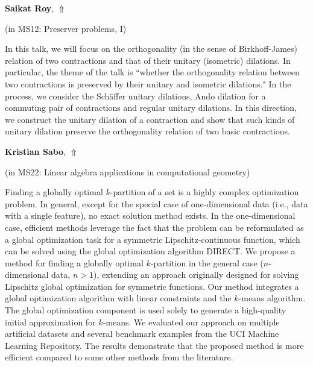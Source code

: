 \documentclass[ILAS2025-program.tex]{subfiles}
\begin{document}
     \hypertarget{down0162}{}\begin{ilasabstract}
    
    \textbf{Saikat Roy},  \hfill \hyperlink{up0162}{$\Uparrow$}
    
    (in {\color{mstitle}MS12: Preserver problems, I})
        
        \mtskip
    In this talk, we will focus on the orthogonality (in the sense of Birkhoff-James) relation of two contractions and that of their unitary (isometric) dilations. In particular, the theme of the talk is ``whether the orthogonality relation between two contractions is preserved by their unitary and isometric dilations." In the process, we consider the Sch\"{a}ffer unitary dilations, Ando dilation for a commuting pair of contractions and regular unitary dilations. In this direction, we construct the unitary dilation of a contraction and show that such kinds of unitary dilation preserve the orthogonality relation of two basic contractions.\end{ilasabstract}
     \hypertarget{down0069}{}\begin{ilasabstract}
    
    \textbf{Kristian Sabo},  \hfill \hyperlink{up0069}{$\Uparrow$}
    
    (in {\color{mstitle}MS22: Linear algebra applications in computational geometry})
        
        \mtskip
    Finding a globally optimal \( k \)-partition of a set is a highly complex optimization problem. In general, except for the special case of one-dimensional data (i.e., data with a single feature), no exact solution method exists. In the one-dimensional case, efficient methods leverage the fact that the problem can be reformulated as a global optimization task for a symmetric Lipschitz-continuous function, which can be solved using the global optimization algorithm DIRECT.   We propose a method for finding a globally optimal \( k \)-partition in the general case (\( n \)-dimensional data, \( n > 1 \)), extending an approach originally designed for solving Lipschitz global optimization for symmetric functions. Our method integrates a global optimization algorithm with linear constraints and the \( k \)-means algorithm. The global optimization component is used solely to generate a high-quality initial approximation for \( k \)-means.   We evaluated our approach on multiple artificial datasets and several benchmark examples from the UCI Machine Learning Repository. The results demonstrate that the proposed method is more efficient compared to some other methods from the literature. \end{ilasabstract}
\end{document}
